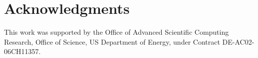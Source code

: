 \section*{Acknowledgments}

This work was supported by the Office of Advanced Scientific Computing Research,
Office of Science, US Department of Energy, under Contract DE-AC02-06CH11357.
